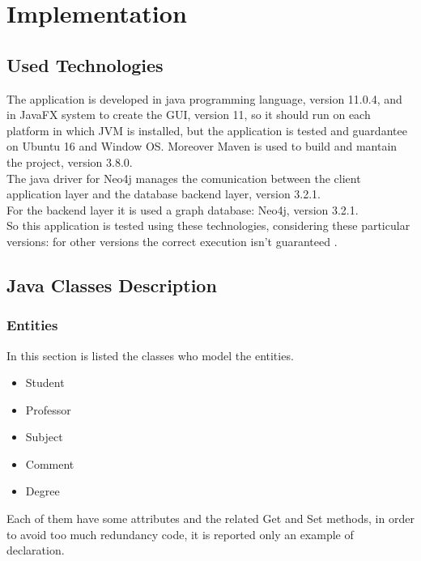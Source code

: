 \documentclass[a4paper]{article}
\begin{document}
\section{Implementation}

\subsection{Used Technologies}
The application is developed in java programming language, version 11.0.4, and in JavaFX system to create the GUI, version 11, so it should run on each platform in which JVM is installed, but the application is tested and guardantee on Ubuntu 16 and Window OS. Moreover Maven is used  to build and mantain the project, version 3.8.0. \\
The java driver for Neo4j manages the comunication between the client application layer and the database backend layer, version 3.2.1.\\ 
For the backend layer it is used a graph database: Neo4j, version 3.2.1.\\
So this application is tested using these technologies, considering these particular versions: for other versions the correct execution isn't guaranteed .\\

\subsection{Java Classes Description}
\subsubsection{Entities}
In this section is listed the classes who model the entities.
\begin{itemize}
\item Student
\item Professor
\item Subject
\item Comment
\item Degree
\end{itemize}
Each of them have some attributes and the related Get and Set methods, in order to avoid too much redundancy code, it is reported only an example of declaration.
\end{document}
